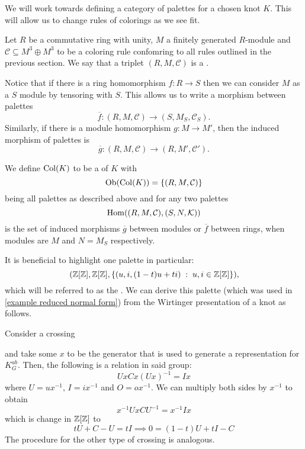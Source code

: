 We will work towards defining a category of palettes for a chosen knot $K$. This will allow us to change rules of colorings as we see fit.

\begin{definition}[palette]
  Let $R$ be a commutative ring with unity, $M$ a finitely generated $R$-module and $\mathcal{C}\subseteq M^3\oplus M^3$ to be a coloring rule confomring to all rules outlined in the previous section. We say that a triplet $(R, M, \mathcal{C})$ is a .
\end{definition}

Notice that if there is a ring homomorphism $f:R\to S$ then we can consider $M$ as a $S$ module by tensoring with $S$. This allows us to write a morphism between palettes
$$\overline{f}:(R, M, \mathcal{C})\to (S, M_S, \mathcal{C}_S).$$
Similarly, if there is a module homomorphism $g:M\to M'$, then the induced morphism of palettes is
$$\overline{g}:(R, M, \mathcal{C})\to (R, M', \mathcal{C}').$$

\begin{definition}
  We define $\operatorname{Col}(K)$ to be a  of $K$ with 
  $$\text{Ob}(\operatorname{Col}(K))=\{(R, M, \mathcal{C})\}$$
  being all palettes as described above and for any two palettes
  $$\operatorname{Hom}((R, M, \mathcal{C}), (S, N, \mathcal{K}))$$
  is the set of induced morphisms $\overline{g}$ between modules or $\overline{f}$ between rings, when modules are $M$ and $N=M_S$ respectively.
\end{definition}

It is beneficial to highlight one palette in particular: 
$${(\operatorname{\mathbb{Z}}[\operatorname{\mathbb{Z}}], \operatorname{\mathbb{Z}}[\operatorname{\mathbb{Z}}], \{(u, i, (1-t)u+ti)\;:\;u,i\in\operatorname{\mathbb{Z}}[\operatorname{\mathbb{Z}}]\})},$$
which will be referred to as the . We can derive this palette (which was used in \cref{example reduced normal form}) from the Wirtinger presentation of a knot as follows.

Consider a crossing
\begin{center}
\end{center}
and take some $x$ to be the generator that is used to generate a representation for $K_G^{ab}$. Then, the following is a relation in said group:
$$UxCx(Ux)^{-1}=Ix$$
where $U=ux^{-1}$, $I=ix^{-1}$ and $O=ox^{-1}$. 
We can multiply both sides by $x^{-1}$ to obtain
$$x^{-1}UxCU^{-1}=x^{-1}Ix$$
which is change in $\operatorname{\mathbb{Z}}[\operatorname{\mathbb{Z}}]$ to
$$
tU+C-U=tI\implies 0=(1-t)U+tI-C
$$
The procedure for the other type of crossing is analogous.

